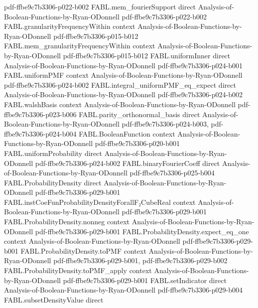 \begin{theorem}
  {pdf-ffbe9c7b3306-p022-b002}
\proofstep
  {FABL.mem_fourierSupport}
  {direct}
  {Analysis-of-Boolean-Functions-by-Ryan-ODonnell}
  {pdf-ffbe9c7b3306-p022-b002}
\proofstep
  {FABL.granularityFrequencyWithin}
  {context}
  {Analysis-of-Boolean-Functions-by-Ryan-ODonnell}
  {pdf-ffbe9c7b3306-p015-b012}
\proofstep
  {FABL.mem_granularityFrequencyWithin}
  {context}
  {Analysis-of-Boolean-Functions-by-Ryan-ODonnell}
  {pdf-ffbe9c7b3306-p015-b012}
\proofstep
  {FABL.uniformInner}
  {direct}
  {Analysis-of-Boolean-Functions-by-Ryan-ODonnell}
  {pdf-ffbe9c7b3306-p024-b001}
\proofstep
  {FABL.uniformPMF}
  {context}
  {Analysis-of-Boolean-Functions-by-Ryan-ODonnell}
  {pdf-ffbe9c7b3306-p024-b002}
\proofstep
  {FABL.integral_uniformPMF_eq_expect}
  {direct}
  {Analysis-of-Boolean-Functions-by-Ryan-ODonnell}
  {pdf-ffbe9c7b3306-p024-b002}
\proofstep
  {FABL.walshBasis}
  {context}
  {Analysis-of-Boolean-Functions-by-Ryan-ODonnell}
  {pdf-ffbe9c7b3306-p023-b006}
\proofstep
  {FABL.parity_orthonormal_basis}
  {direct}
  {Analysis-of-Boolean-Functions-by-Ryan-ODonnell}
  {pdf-ffbe9c7b3306-p024-b003,
    pdf-ffbe9c7b3306-p024-b004}
\proofstep
  {FABL.BooleanFunction}
  {context}
  {Analysis-of-Boolean-Functions-by-Ryan-ODonnell}
  {pdf-ffbe9c7b3306-p020-b001}
\proofstep
  {FABL.uniformProbability}
  {direct}
  {Analysis-of-Boolean-Functions-by-Ryan-ODonnell}
  {pdf-ffbe9c7b3306-p024-b002}
\proofstep
  {FABL.binaryFourierCoeff}
  {direct}
  {Analysis-of-Boolean-Functions-by-Ryan-ODonnell}
  {pdf-ffbe9c7b3306-p025-b004}
\proofstep
  {FABL.ProbabilityDensity}
  {direct}
  {Analysis-of-Boolean-Functions-by-Ryan-ODonnell}
  {pdf-ffbe9c7b3306-p029-b001}
\proofstep
  {FABL.instCoeFunProbabilityDensityForallF₂CubeReal}
  {context}
  {Analysis-of-Boolean-Functions-by-Ryan-ODonnell}
  {pdf-ffbe9c7b3306-p029-b001}
\proofstep
  {FABL.ProbabilityDensity.nonneg}
  {context}
  {Analysis-of-Boolean-Functions-by-Ryan-ODonnell}
  {pdf-ffbe9c7b3306-p029-b001}
\proofstep
  {FABL.ProbabilityDensity.expect_eq_one}
  {context}
  {Analysis-of-Boolean-Functions-by-Ryan-ODonnell}
  {pdf-ffbe9c7b3306-p029-b001}
\proofstep
  {FABL.ProbabilityDensity.toPMF}
  {context}
  {Analysis-of-Boolean-Functions-by-Ryan-ODonnell}
  {pdf-ffbe9c7b3306-p029-b001,
    pdf-ffbe9c7b3306-p029-b002}
\proofstep
  {FABL.ProbabilityDensity.toPMF_apply}
  {context}
  {Analysis-of-Boolean-Functions-by-Ryan-ODonnell}
  {pdf-ffbe9c7b3306-p029-b001}
\proofstep
  {FABL.setIndicator}
  {direct}
  {Analysis-of-Boolean-Functions-by-Ryan-ODonnell}
  {pdf-ffbe9c7b3306-p029-b004}
\proofstep
  {FABL.subsetDensityValue}
  {direct}

\end{theorem}
